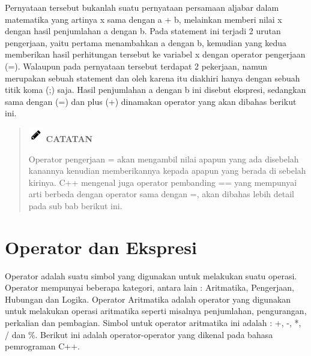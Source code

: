 Pernyataan tersebut bukanlah suatu pernyataan persamaan aljabar dalam
matematika yang artinya x sama dengan a + b, melainkan memberi nilai x
dengan hasil penjumlahan a dengan b. Pada statement ini terjadi 2 urutan
pengerjaan, yaitu pertama menambahkan a dengan b, kemudian yang kedua
memberikan hasil perhitungan tersebut ke variabel x dengan operator
pengerjaan (=). Walaupun pada pernyataan tersebut terdapat 2 pekerjaan,
namun merupakan sebuah statement dan oleh karena itu diakhiri hanya
dengan sebuah titik koma (;) saja. Hasil penjumlahan a dengan b ini
disebut ekspresi, sedangkan sama dengan (=) dan plus (+) dinamakan
operator yang akan dibahas berikut ini.

\begin{quotation}
\includegraphics{images/pencil}	 \textbf{CATATAN}
	 
	 Operator pengerjaan = akan mengambil nilai apapun yang ada disebelah
	 kanannya kenudian memberikannya kepada apapun yang berada di sebelah
	 kirinya. C++ mengenal juga operator pembanding == yang mempunyai
	 arti berbeda dengan operator sama dengan =, akan dibahas lebih
	 detail pada sub bab berikut ini.
\end{quotation}


\section{Operator dan Ekspresi}\label{operator-dan-ekspresi}

Operator adalah suatu simbol yang digunakan untuk melakukan suatu
operasi. Operator mempunyai beberapa kategori, antara lain : Aritmatika,
Pengerjaan, Hubungan dan Logika. Operator Aritmatika adalah operator
yang digunakan untuk melakukan operasi aritmatika seperti misalnya
penjumlahan, pengurangan, perkalian dan pembagian. Simbol untuk operator
aritmatika ini adalah : +, -, *, / dan \%. Berikut ini adalah
operator-operator yang dikenal pada bahasa pemrograman C++.

